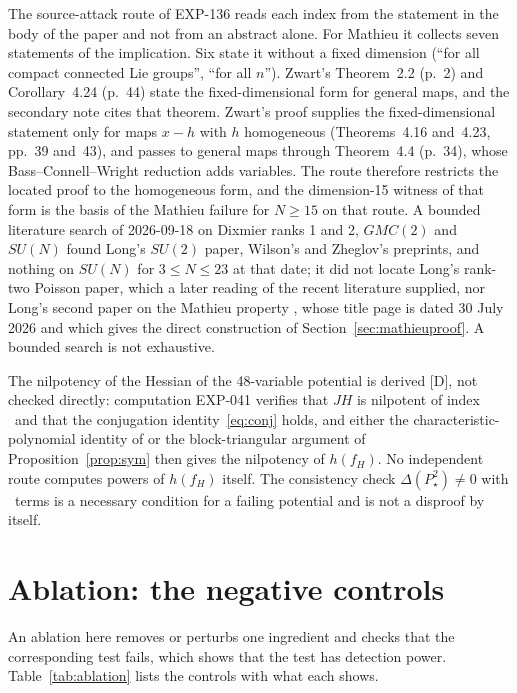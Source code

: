 \documentclass[11pt]{article}
\theoremstyle{remark}
\newcommand{\EXP}[1]{\mbox{EXP-#1}}
\begin{document}
The source-attack route of \EXP{136} reads each index from the statement in the body of the paper and not from an abstract alone. For Mathieu it collects seven statements of the implication. Six state it without a fixed dimension (``for all compact connected Lie groups'', ``for all $n$''). Zwart's Theorem~2.2 (p.~2) and Corollary~4.24 (p.~44) state the fixed-dimensional form for general maps, and the secondary note \cite{Zhang2026} cites that theorem. Zwart's proof supplies the fixed-dimensional statement only for maps $x-h$ with $h$ homogeneous (Theorems~4.16 and~4.23, pp.~39 and~43), and passes to general maps through Theorem~4.4 (p.~34), whose Bass--Connell--Wright reduction adds variables. The route therefore restricts the located proof to the homogeneous form, and the dimension-15 witness of that form is the basis of the Mathieu failure for $N\ge15$ on that route. A bounded literature search of 2026-09-18 on Dixmier ranks 1 and 2, $GMC(2)$ and $SU(N)$ found Long's $SU(2)$ paper, Wilson's and Zheglov's preprints, and nothing on $SU(N)$ for $3\le N\le23$ at that date; it did not locate Long's rank-two Poisson paper, which a later reading of the recent literature supplied, nor Long's second paper on the Mathieu property \cite{LongMathieu2026}, whose title page is dated 30 July 2026 and which gives the direct construction of Section~\ref{sec:mathieuproof}. A bounded search is not exhaustive.

The nilpotency of the Hessian of the 48-variable potential is derived [D], not checked directly: computation \EXP{041} verifies that $JH$ is nilpotent of index \nnilindex\ and that the conjugation identity~\eqref{eq:conj} holds, and either the characteristic-polynomial identity of \cite[proof of Lemma~1.2, p.~2203]{dBvdE2005} or the block-triangular argument of Proposition~\ref{prop:sym} then gives the nilpotency of $h(f_H)$. No independent route computes powers of $h(f_H)$ itself. The consistency check $\Delta(P_\star^2)\ne0$ with \ndeltaterms\ terms is a necessary condition for a failing potential and is not a disproof by itself.

\section{Ablation: the negative controls}\label{sec:ablation}

An ablation here removes or perturbs one ingredient and checks that the corresponding test fails, which shows that the test has detection power. Table~\ref{tab:ablation} lists the controls with what each shows.
\end{document}
